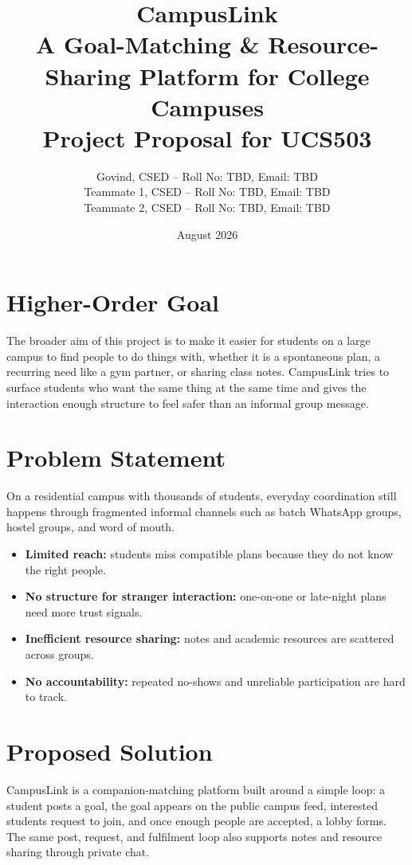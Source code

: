 \documentclass[12pt,a4paper]{article}
\title{
  \textbf{CampusLink}\\
  \large A Goal-Matching \& Resource-Sharing Platform for College Campuses\\
  \vspace{0.5cm}
  \normalsize Project Proposal for UCS503
}
\author{
  Govind, CSED -- Roll No: TBD, Email: TBD\\
  Teammate 1, CSED -- Roll No: TBD, Email: TBD\\
  Teammate 2, CSED -- Roll No: TBD, Email: TBD
}
\date{August 2026}
\begin{document}
\maketitle

\section{Higher-Order Goal}

The broader aim of this project is to make it easier for students on a large campus to find people to do things with, whether it is a spontaneous plan, a recurring need like a gym partner, or sharing class notes. CampusLink tries to surface students who want the same thing at the same time and gives the interaction enough structure to feel safer than an informal group message.

\section{Problem Statement}

On a residential campus with thousands of students, everyday coordination still happens through fragmented informal channels such as batch WhatsApp groups, hostel groups, and word of mouth.

\begin{itemize}[leftmargin=*]
  \item \textbf{Limited reach:} students miss compatible plans because they do not know the right people.
  \item \textbf{No structure for stranger interaction:} one-on-one or late-night plans need more trust signals.
  \item \textbf{Inefficient resource sharing:} notes and academic resources are scattered across groups.
  \item \textbf{No accountability:} repeated no-shows and unreliable participation are hard to track.
\end{itemize}

\section{Proposed Solution}

CampusLink is a companion-matching platform built around a simple loop: a student posts a goal, the goal appears on the public campus feed, interested students request to join, and once enough people are accepted, a lobby forms. The same post, request, and fulfilment loop also supports notes and resource sharing through private chat.
\end{document}
